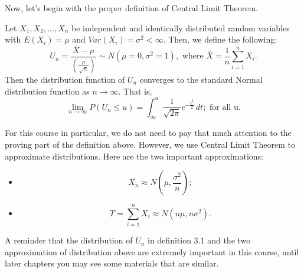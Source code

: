 Now, let's begin with the proper definition of Central Limit Theorem.

\begin{definition}
Let $X_1, X_2, ..., X_n$ be independent and identically distributed random variables with $E(X_i) = \mu$ and $Var(X_i) = \sigma^2 < \infty$. Then, we define the following: \[ U_{n} = \frac{\bar{X} - \mu}{(\frac{\sigma}{\sqrt{n}})} \sim N(\mu = 0, \sigma^2 = 1), \text{ where $\bar{X} = \frac{1}{n} \sum_{i =1}^{n}X_i$.}\]
Then the distribution function of $U_{n}$ converges to the standard Normal distribution function as $n \longrightarrow \infty$. That is, \[ \lim_{n\to\infty}P(U_n \le u) = \int_{\infty}^{u} \frac{1}{\sqrt{2\pi}} e^{-\frac{t^2}{2}}\,dt; \text{ for all u.}\]
\end{definition}

For this course in particular, we do not need to pay that much attention to the proving part of the definition above. However, we use Central Limit Theorem to approximate distributions. Here are the two important approximations:

\begin{itemize}
	\item \[ \bar{X_n} \approx N(\mu, \frac{\sigma^2}{n});\]
	\item \[ T = \sum_{i = 1}^{n}X_i \approx N(n\mu, n\sigma^2).\]
\end{itemize}

A reminder that the distribution of $U_n$ in definition $3.1$ and the two approximation of distribution above are extremely important in this course, until later chapters you may see some materials that are similar.